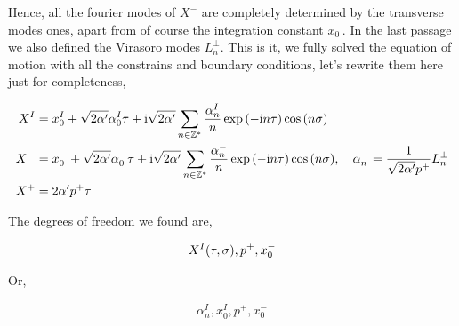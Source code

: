 Hence, all the fourier modes of $X^-$ are completely determined by the transverse modes ones, apart from of course the integration constant $x^-_0$. In the 
last passage we also defined the Virasoro modes $L_n^\perp$. This is it, we fully solved the equation of motion with all the constrains and boundary 
conditions, let's rewrite them here just for completeness,

\begin{align*}
    X^I&=x_0^I+\sqrt{2\alpha'} \alpha_0^I\tau+\im\sqrt{2\alpha'}\sum\limits_{n\in\mathbb Z^\ast}\frac{\alpha_n^I}{n}\exp\qty(-\im n\tau)\cos\qty(n\sigma)\\
    X^-&=x_0^-+\sqrt{2\alpha'} \alpha_0^-\tau+\im\sqrt{2\alpha'}\sum\limits_{n\in\mathbb Z^\ast}\frac{\alpha_n^-}{n}\exp\qty(-\im n\tau)\cos\qty(n\sigma),\ \ \ \alpha^-_n=\frac{1}{\sqrt{2\alpha'}p^+}L^\perp_n\\
    X^+&=2\alpha'p^+\tau
\end{align*}

The degrees of freedom we found are,

\begin{align*}
    X^I\qty(\tau,\sigma),p^+,x_0^-
\end{align*}

Or,

\begin{align*}
    \alpha_n^I,x_0^I,p^+,x_0^-
\end{align*}